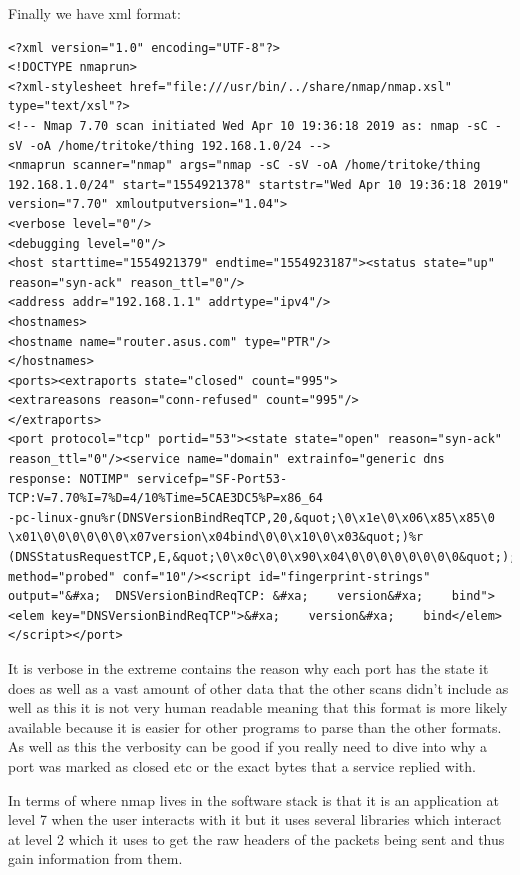 \documentclass[titlepage]{article}
\begin{document}
Finally we have \gls{xml} format:
\lstset{language=xml}
\begin{lstlisting}
<?xml version="1.0" encoding="UTF-8"?>
<!DOCTYPE nmaprun>
<?xml-stylesheet href="file:///usr/bin/../share/nmap/nmap.xsl" type="text/xsl"?>
<!-- Nmap 7.70 scan initiated Wed Apr 10 19:36:18 2019 as: nmap -sC -sV -oA /home/tritoke/thing 192.168.1.0/24 -->
<nmaprun scanner="nmap" args="nmap -sC -sV -oA /home/tritoke/thing 192.168.1.0/24" start="1554921378" startstr="Wed Apr 10 19:36:18 2019" version="7.70" xmloutputversion="1.04">
<verbose level="0"/>
<debugging level="0"/>
<host starttime="1554921379" endtime="1554923187"><status state="up" reason="syn-ack" reason_ttl="0"/>
<address addr="192.168.1.1" addrtype="ipv4"/>
<hostnames>
<hostname name="router.asus.com" type="PTR"/>
</hostnames>
<ports><extraports state="closed" count="995">
<extrareasons reason="conn-refused" count="995"/>
</extraports>
<port protocol="tcp" portid="53"><state state="open" reason="syn-ack" reason_ttl="0"/><service name="domain" extrainfo="generic dns response: NOTIMP" servicefp="SF-Port53-TCP:V=7.70%I=7%D=4/10%Time=5CAE3DC5%P=x86_64
-pc-linux-gnu%r(DNSVersionBindReqTCP,20,&quot;\0\x1e\0\x06\x85\x85\0
\x01\0\0\0\0\0\0\x07version\x04bind\0\0\x10\0\x03&quot;)%r
(DNSStatusRequestTCP,E,&quot;\0\x0c\0\0\x90\x04\0\0\0\0\0\0\0\0&quot;);" method="probed" conf="10"/><script id="fingerprint-strings" output="&#xa;  DNSVersionBindReqTCP: &#xa;    version&#xa;    bind"><elem key="DNSVersionBindReqTCP">&#xa;    version&#xa;    bind</elem>
</script></port>
\end{lstlisting}
It is verbose in the extreme contains the reason why each port has the state it does as well as a
vast amount of other data that the other scans didn't include as well as this it is not very human
readable meaning that this format is more likely available because it is easier for other programs
to parse than the other formats. As well as this the verbosity can be good if you really need to
dive into why a port was marked as closed etc or the exact bytes that a service replied with.

In terms of where nmap lives in the software stack is that it is an application at level 7 when the
user interacts with it but it uses several libraries which interact at level 2 which it uses to get
the raw headers of the packets being sent and thus gain information from them.
\end{document}
